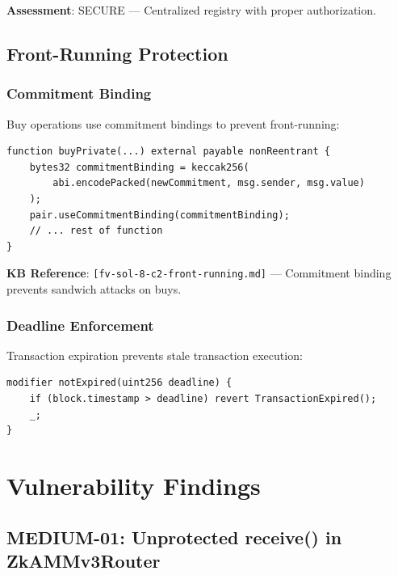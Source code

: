 \documentclass[12pt,a4paper]{article}
\begin{document}
\textbf{Assessment}: \textcolor{lowsev}{SECURE} --- Centralized registry with proper authorization.

\subsection{Front-Running Protection}

\subsubsection{Commitment Binding}

Buy operations use commitment bindings to prevent front-running:

\begin{lstlisting}[language=Solidity]
function buyPrivate(...) external payable nonReentrant {
    bytes32 commitmentBinding = keccak256(
        abi.encodePacked(newCommitment, msg.sender, msg.value)
    );
    pair.useCommitmentBinding(commitmentBinding);
    // ... rest of function
}
\end{lstlisting}

\textbf{KB Reference}: \texttt{[fv-sol-8-c2-front-running.md]} --- Commitment binding prevents sandwich attacks on buys.

\subsubsection{Deadline Enforcement}

Transaction expiration prevents stale transaction execution:

\begin{lstlisting}[language=Solidity]
modifier notExpired(uint256 deadline) {
    if (block.timestamp > deadline) revert TransactionExpired();
    _;
}
\end{lstlisting}

\section{Vulnerability Findings}

\subsection{MEDIUM-01: Unprotected receive() in ZkAMMv3Router}
\end{document}
